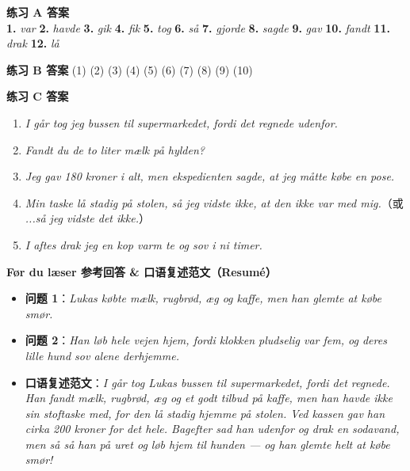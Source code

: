\begin{answerbox}
\textbf{练习 A 答案}\\
\textbf{1.} \textit{var} \quad \textbf{2.} \textit{havde} \quad \textbf{3.} \textit{gik} \quad \textbf{4.} \textit{fik} \quad \textbf{5.} \textit{tog} \quad \textbf{6.} \textit{så} \quad \textbf{7.} \textit{gjorde} \quad \textbf{8.} \textit{sagde} \quad \textbf{9.} \textit{gav} \quad \textbf{10.} \textit{fandt} \quad \textbf{11.} \textit{drak} \quad \textbf{12.} \textit{lå}

\vspace{0.2em}

\textbf{练习 B 答案}
(1)  \quad (2)  \quad (3)  \quad (4)  \quad (5)  \quad (6)  \quad (7)  \quad (8)  \quad (9)  \quad (10) 

\textbf{练习 C 答案}
\begin{enumerate}
  \item \textit{I går tog jeg bussen til supermarkedet, fordi det regnede udenfor.}
  \item \textit{Fandt du de to liter mælk på hylden?}
  \item \textit{Jeg gav 180 kroner i alt, men ekspedienten sagde, at jeg måtte købe en pose.}
  \item \textit{Min taske lå stadig på stolen, så jeg vidste ikke, at den ikke var med mig.}（或 \textit{...så jeg vidste det ikke.}）
  \item \textit{I aftes drak jeg en kop varm te og sov i ni timer.}
\end{enumerate}

\textbf{Før du læser 参考回答 \& 口语复述范文（Resumé）}
\begin{itemize}
  \item \textbf{问题 1}：\textit{Lukas købte mælk, rugbrød, æg og kaffe, men han glemte at købe smør.}
  \item \textbf{问题 2}：\textit{Han løb hele vejen hjem, fordi klokken pludselig var fem, og deres lille hund sov alene derhjemme.}
  \item \textbf{口语复述范文}：\textit{I går tog Lukas bussen til supermarkedet, fordi det regnede. Han fandt mælk, rugbrød, æg og et godt tilbud på kaffe, men han havde ikke sin stoftaske med, for den lå stadig hjemme på stolen. Ved kassen gav han cirka 200 kroner for det hele. Bagefter sad han udenfor og drak en sodavand, men så så han på uret og løb hjem til hunden — og han glemte helt at købe smør!}
\end{itemize}
\end{answerbox}
